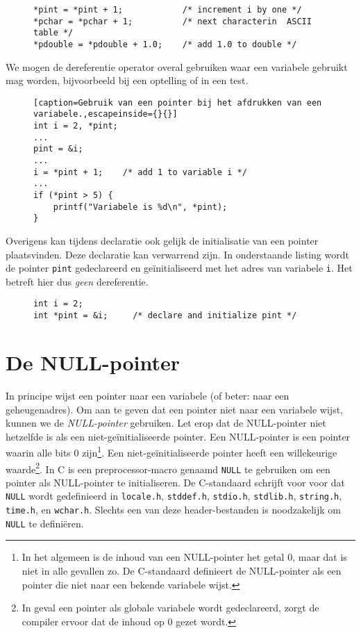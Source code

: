 \begin{figure}[!ht]
\begin{lstlisting}[caption=Gebruik van een pointer bij een toekenning.]
*pint = *pint + 1;            /* increment i by one */
*pchar = *pchar + 1;          /* next characterin  ASCII table */
*pdouble = *pdouble + 1.0;    /* add 1.0 to double */
\end{lstlisting}
\end{figure}

We mogen de dereferentie operator overal gebruiken waar een variabele gebruikt mag worden, bijvoorbeeld bij een optelling of in een test.

\begin{figure}[!ht]
\begin{lstlisting}[caption=Gebruik van een pointer bij het afdrukken van een variabele.,escapeinside={}{}]
int i = 2, *pint;
...
pint = &i;
...
i = *pint + 1;    /* add 1 to variable i */
...
if (*pint > 5) {
    printf("Variabele is %d\n", *pint);
}
\end{lstlisting}
\end{figure}

Overigens kan tijdens declaratie ook gelijk de initialisatie van een pointer plaatsvinden. Deze declaratie kan verwarrend zijn. In onderstaande listing wordt de pointer \texttt{pint} gedeclareerd en geïnitialiseerd met het adres van variabele \texttt{i}. Het betreft hier dus \textsl{geen} dereferentie.

\begin{figure}[!ht]
\begin{lstlisting}[caption=Declaratie en initialisatie van een pointer.]
int i = 2;
int *pint = &i;     /* declare and initialize pint */
\end{lstlisting}
\end{figure}


\section{De NULL-pointer}
\label{sec:nullpointer}
In principe wijst een pointer naar een variabele (of beter: naar een geheugenadres). Om aan te geven dat een pointer niet naar een variabele wijst, kunnen we de \textsl{NULL-pointer} gebruiken. Let erop dat de NULL-pointer niet hetzelfde is als een niet-geïnitialiseerde pointer. Een NULL-pointer is een pointer waarin alle bits 0 zijn\footnote{In het algemeen is de inhoud van een NULL-pointer het getal 0, maar dat is niet in alle gevallen zo. De C-standaard definieert de NULL-pointer als een pointer die niet naar een bekende variabele wijst.}. Een niet-geïnitialiseerde pointer heeft een willekeurige waarde\footnote{In geval een pointer als globale variabele wordt gedeclareerd, zorgt de compiler ervoor dat de inhoud op 0 gezet wordt.}. In C is een preprocessor-macro genaamd \texttt{NULL} te gebruiken om een pointer als NULL-pointer te initialiseren. De C-standaard schrijft voor voor dat \texttt{NULL} wordt gedefinieerd in \texttt{locale.h}, \texttt{stddef.h}, \texttt{stdio.h}, \texttt{stdlib.h}, \texttt{string.h}, \texttt{time.h}, en \texttt{wchar.h}. Slechts een van deze header-bestanden is noodzakelijk om \texttt{NULL} te definiëren.

